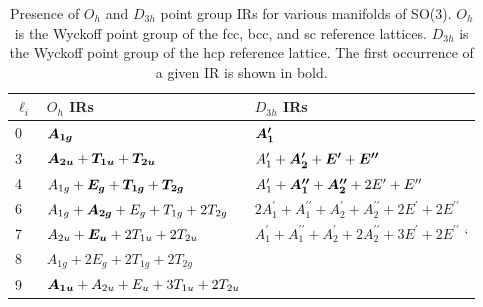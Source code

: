 \documentclass[preprint]{iucr}              %
\newcommand{\mb}[1]{\ensuremath{\mbox{\boldmath $ #1 $}}}
\begin{document}

\pagebreak


%
%
%

\pagebreak

\begin{table}%
\caption{Presence of $O_h$ and $D_{3h}$ point group IRs for various
manifolds of SO(3). $O_h$ is the Wyckoff point group of the fcc,
bcc, and sc reference lattices. $D_{3h}$ is the Wyckoff point group
of the hcp reference lattice. The first occurrence of a given IR is
shown in bold.}\label{wyckoff_IRs}\small
\begin{tabular}{lll}\hline
$\ell_i$ & $O_h$ IRs &  $D_{3h}$ IRs \\
\hline
0 & $\mb{A_{1g}}$ & $\mb{A^\prime_1}$ \\
3 & $\mb{A_{2u}}+\mb{T_{1u}}+\mb{T_{2u}}$ & $A^\prime_1+\mb{A^{\prime}_2}+\mb{E^\prime}+\mb{E^{\prime\prime}}$ \\
4 & $A_{1g}+\mb{E_{g}}+\mb{T_{1g}}+\mb{T_{2g}}$ & $A^\prime_1+\mb{A^{\prime\prime}_1}+\mb{A^{\prime\prime}_2}+2E^\prime+E^{\prime\prime}$\\
6 & $A_{1g}+\mb{A_{2g}}+E_g+T_{1g}+2T_{2g}$ & $2A^\prime_1+A^{\prime\prime}_1+A^{\prime}_2+A^{\prime\prime}_2+2E^\prime+2E^{\prime\prime}$ \\
7 & $A_{2u}+\mb{E_u}+2T_{1u}+2T_{2u}$ & $A^\prime_1+A^{\prime\prime}_1+A^{\prime}_2+2A^{\prime\prime}_2+3E^\prime+2E^{\prime\prime}$ `\\
8 & $A_{1g}+2E_g+2T_{1g}+2T_{2g}$ & \\
9 & $\mb{A_{1u}}+A_{2u}+E_u+3T_{1u}+2T_{2u}$ & \\
\hline
\end{tabular}
\end{table}

\pagebreak
\end{document}
